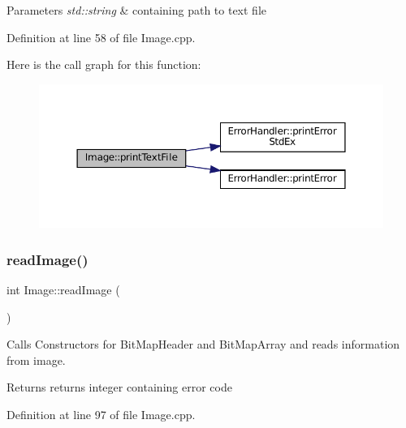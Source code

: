 \begin{DoxyParams}{Parameters}
{\em std\+::string} & containing path to text file \\
\hline
\end{DoxyParams}


Definition at line 58 of file Image.\+cpp.

Here is the call graph for this function\+:\nopagebreak
\begin{figure}[H]
\begin{center}
\leavevmode
\includegraphics[width=350pt]{classImage_ae5daf791502caefeae1b15360d354513_cgraph}
\end{center}
\end{figure}
\mbox{\label{classImage_ac0aa1f41cb368d87b20dd38839218d93}} 
\subsubsection{\texorpdfstring{readImage()}{readImage()}}
{\footnotesize\ttfamily int Image\+::read\+Image (\begin{DoxyParamCaption}{ }\end{DoxyParamCaption})}



Calls Constructors for Bit\+Map\+Header and Bit\+Map\+Array and reads information from image. 

\begin{DoxyReturn}{Returns}
returns integer containing error code 
\end{DoxyReturn}


Definition at line 97 of file Image.\+cpp.

